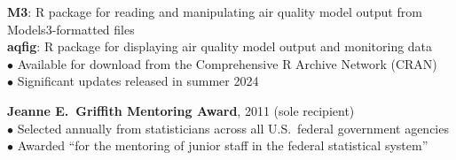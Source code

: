\documentclass[11pt]{article}
\def\newsectn{\vspace*{0.6cm}}
\begin{document}


\newsectn
{}


\textbf{M3}: R package for reading and manipulating air quality model
output from Models3-formatted files\\
\textbf{aqfig}: R package for displaying air quality model output and
monitoring data\\
$\bullet$ Available for download from the Comprehensive R Archive Network
(CRAN)\\
$\bullet$ Significant updates released in summer 2024






\newsectn
{}

\textbf{Jeanne E.~Griffith Mentoring Award}, 2011 (sole recipient)\\  %
$\bullet$ Selected annually from statisticians across all U.S.~federal government agencies\\
$\bullet$ Awarded ``for the mentoring of junior staff in the federal statistical
system''
\end{document}

